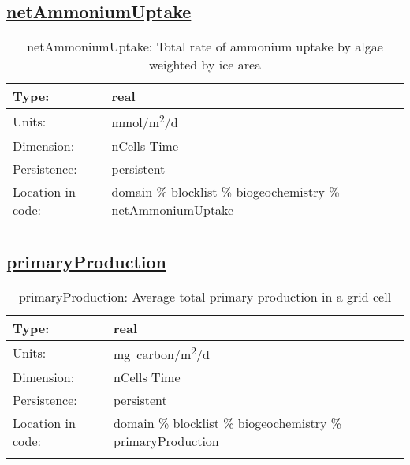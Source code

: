 \subsection[netAmmoniumUptake]{\hyperref[sec:var_tab_biogeochemistry]{netAmmoniumUptake}}
\label{subsec:var_sec_biogeochemistry_netAmmoniumUptake}
\begin{center}
\begin{longtable}{| p{2.0in} | p{4.0in} |}
        \hline 
        Type: & real \\
        \hline 
        Units: & \si{mmol/m^2/d} \\
        \hline 
        Dimension: & nCells Time \\
        \hline 
        Persistence: & persistent \\
        \hline 
         Location in code: & domain \% blocklist \% biogeochemistry \% netAmmoniumUptake \\
         \hline 
    \caption{netAmmoniumUptake: Total rate of ammonium uptake by algae weighted by ice area}
\end{longtable}
\end{center}
\subsection[primaryProduction]{\hyperref[sec:var_tab_biogeochemistry]{primaryProduction}}
\label{subsec:var_sec_biogeochemistry_primaryProduction}
\begin{center}
\begin{longtable}{| p{2.0in} | p{4.0in} |}
        \hline 
        Type: & real \\
        \hline 
        Units: & \si{mg.carbon/m^2/d} \\
        \hline 
        Dimension: & nCells Time \\
        \hline 
        Persistence: & persistent \\
        \hline 
         Location in code: & domain \% blocklist \% biogeochemistry \% primaryProduction \\
         \hline 
    \caption{primaryProduction: Average total primary production in a grid cell}
\end{longtable}
\end{center}
